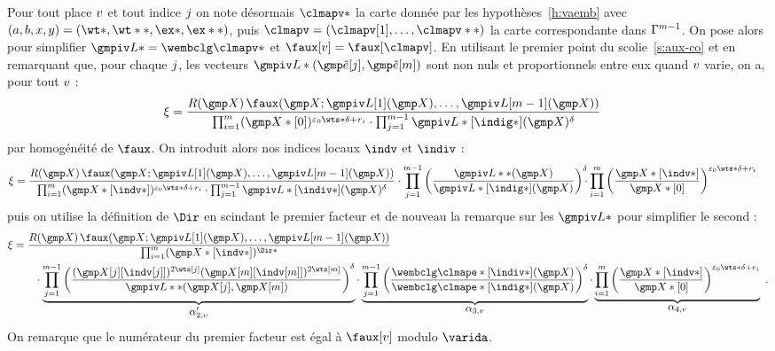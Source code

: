 Pour tout place \( v \) et tout indice \( j \) on note désormais
\( \clmapv* \) la carte donnée par les hypothèses~\ref{h:vaemb} avec \( (a, b,
  x, y) = (\wt*, \wt**, \ex*, \ex**) \), puis \( \clmapv = (\clmapv[1], \dots,
  \clmapv**) \) la carte correspondante dans \( \Gamma^{m-1} \).  On
pose alors pour simplifier \( \wembclv* = \wembclg\clmapv* \) et \( \fauxv =
  \faux[\clmapv] \).  En utilisant le premier point du scolie~\ref{s:aux-co}
et en remarquant que, pour chaque \( j \), les vecteurs \( \wembclv*
  (\cexa[\fcti], \cexa[\puiss]) \) sont non nuls et proportionnels entre eux
quand \( v \) varie, on a, pour tout \( v \) :
\begin{align}
  \ratf
  & =
  \frac{
    R(\vmp) \,
    \faux( \vmp; \wembclv[1](\vmp), \dots, \wembclv[\puiss-1](\vmp) )
  }{
    \prod\fctrange
    (\vmp*[0])^{\epsz \wts* \delta + r_\fct}
    \cdot
    \prod\fctirange
    \wembclv*[\indig*](\vmp) ^{ \delta }
  }
\end{align}
par homogénéité de \( \faux \). On introduit alors nos indices locaux \( \indv
\) et \( \indiv \) :
\begin{align}
  \ratf
   & =
  \frac{
    R(\vmp) \,
    \faux( \vmp; \wembclv[1](\vmp), \dots, \wembclv[\puiss-1](\vmp) )
  }{
    \prod\fctrange
    (\vmp*[\indv*])^{\epsz \wts* \delta + r_\fct}
    \cdot
    \prod\fctirange
    \wembclv*[\indiv*](\vmp) ^{ \delta }
  }
  \cdot \prod\fctirange
  \left(
    \frac{ \wembclv**(\vmp) }{ \wembclv*[\indig*](\vmp) }
  \right) ^{ \delta }
  \!\!\! \cdot \prod\fctrange
  \left(
    \frac{ \vmp*[\indv*] }{ \vmp*[0] }
  \right) ^{ \epsz \wts* \delta + r_\fct }
\end{align}
puis on utilise la définition de \( \Dir \) en scindant le premier facteur et
de nouveau la remarque sur les \( \wembclv* \) pour simplifier le second :
\begin{align}
  \ratf
  & =
  \frac{
    R(\vmp) \,
    \faux( \vmp; \wembclv[1](\vmp), \dots, \wembclv[\puiss-1](\vmp) )
  }{
    \prod\fctrange (\vmp*[\indv*]) ^{ \Dir* }
  }
  \\ & \qquad
  \cdot \underbrace{
    \prod\fctirange \left(
      \frac{
        ( \vmp[\fcti ][{\indv[\fcti ]}] )^{ 2\wts[\fcti ] }
        ( \vmp[\puiss][{\indv[\puiss]}] )^{ 2\wts[\puiss] }
      }{
        \wembclv**(\vmp[\fcti], \vmp[\puiss])
      }
    \right)^\delta
  }_{\textstyle \ratfv2'}
  \cdot \underbrace{
    \prod\fctirange \left(
      \frac{
        \wembclg\clmape*[\indiv*](\vmp) }{
        \wembclg\clmape*[\indig*](\vmp) }
    \right) ^{ \delta }
  }_{\textstyle \ratfv3}
  \cdot \underbrace{
    \prod\fctrange \left(
      \frac{ \vmp*[\indv*] }{ \vmp*[0] }
    \right) ^{ \epsz \wts* \delta + r_\fct }
  }_{\textstyle \ratfv4}
  \pmm.
\end{align}
On remarque que le numérateur du premier facteur est égal à \( \fauxv \)
modulo \( \varida \).

